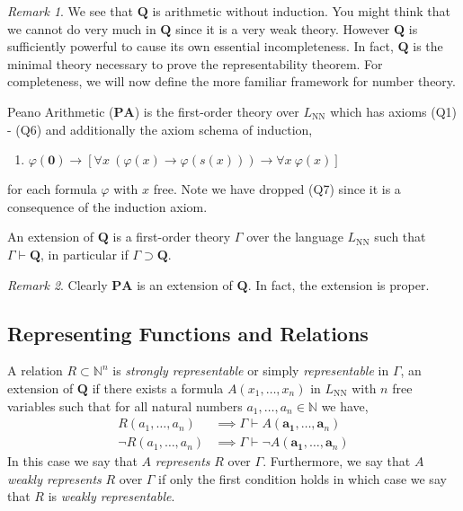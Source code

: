 \documentclass[12pt, leqno]{article}
\newcommand{\N}{\mathbb{N}}
\renewcommand{\bf}[1]{\mathbf{#1}}
\newcommand{\proves}{\vdash}
\newcommand{\uq}[1]{\forall{#1} \:}
\newenvironment{definition}[1][Definition:]{\begin{trivlist}
\item[\hskip \labelsep {\bfseries #1}]}{\end{trivlist}}
\theoremstyle{theorem}
\theoremstyle{definition}
\theoremstyle{definition}
\theoremstyle{remark}
\theoremstyle{definition}
\theoremstyle{remark}
\newtheorem{remark}{Remark}[subsection]
\begin{document}
\begin{remark}
We see that $\bf{Q}$ is arithmetic without induction. You might think that we cannot do very much in $\bf{Q}$ since it is a very weak theory. However $\bf{Q}$ is sufficiently powerful to cause its own essential incompleteness. In fact, $\bf{Q}$ is the minimal theory necessary to prove the representability theorem. For completeness, we will now define the more familiar framework for number theory.
\end{remark}

\begin{definition}
Peano Arithmetic ($\bf{PA}$) is the first-order theory over $L_{\text{NN}}$ which has axioms (Q1) - (Q6) and additionally the axiom schema of induction,
\begin{enumerate}
\item[(PA)] $\varphi(\bf{0}) \to [\uq{x} (\varphi(x) \to \varphi(s(x))) \to \uq{x} \varphi(x)]$
\end{enumerate}
for each formula $\varphi$ with $x$ free. Note we have dropped (Q7) since it is a consequence of the induction axiom. 
\end{definition}

\begin{definition}
An extension of $\bf{Q}$ is a first-order theory $\Gamma$ over the language $L_{\text{NN}}$ such that $\Gamma \proves \bf{Q}$, in particular if $\Gamma \supset \bf{Q}$. 
\end{definition}

\begin{remark}
Clearly $\bf{PA}$ is an extension of $\bf{Q}$. In fact, the extension is proper.
\end{remark}

\subsection{Representing Functions and Relations}

\begin{definition}
A relation $R \subset \N^n$ is \textit{strongly representable} or simply \textit{representable} in $\Gamma$, an extension of $\bf{Q}$ if there exists a formula $A(x_1, \dots, x_n)$ in $L_{\text{NN}}$ with $n$ free variables such that for all natural numbers $a_1, \dots, a_n \in \N$ we have,
\begin{align*}
R(a_1, \dots, a_n) & \implies \Gamma \proves A(\bf{a_1}, \dots, \bf{a}_n)
\\
\neg R(a_1, \dots, a_n) & \implies \Gamma \proves \neg A(\bf{a_1}, \dots, \bf{a}_n)
\end{align*}
In this case we say that $A$ \textit{represents} $R$ over $\Gamma$. Furthermore, we say that $A$ \textit{weakly represents} $R$ over $\Gamma$ if only the first condition holds in which case we say that $R$ is \textit{weakly representable}. 
\end{definition}
\end{document}
